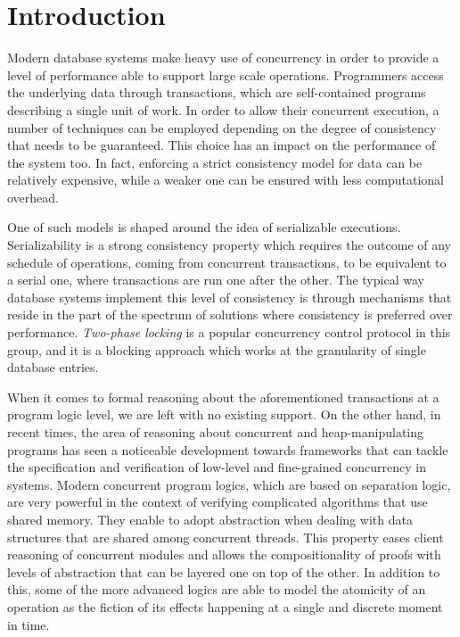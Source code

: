 \chapter{Introduction}

Modern database systems make heavy use of concurrency in order to provide a level of performance able to support large scale operations. Programmers access the underlying data through transactions, which are self-contained programs describing a single unit of work. In order to allow their concurrent execution, a number of techniques can be employed depending on the degree of consistency that needs to be guaranteed. This choice has an impact on the performance of the system too. In fact, enforcing a strict consistency model for data can be relatively expensive, while a weaker one can be ensured with less computational overhead.

One of such models is shaped around the idea of serializable executions. Serializability is a strong consistency property which requires the outcome of any schedule of operations, coming from concurrent transactions, to be equivalent to a serial one, where transactions are run one after the other. The typical way database systems implement this level of consistency is through mechanisms that reside in the part of the spectrum of solutions where consistency is preferred over performance. \textit{Two-phase locking} is a popular concurrency control protocol in this group, and it is a blocking approach which works at the granularity of single database entries.

When it comes to formal reasoning about the aforementioned transactions at a program logic level, we are left with no existing support. On the other hand, in recent times, the area of reasoning about concurrent and heap-manipulating programs has seen a noticeable development towards frameworks that can tackle the specification and verification of low-level and fine-grained concurrency in systems. Modern concurrent program logics, which are based on separation logic, are very powerful in the context of verifying complicated algorithms that use shared memory. They enable to adopt abstraction when dealing with data structures that are shared among concurrent threads. This property eases client reasoning of concurrent modules and allows the compositionality of proofs with levels of abstraction that can be layered one on top of the other. In addition to this, some of the more advanced logics are able to model the atomicity of an operation as the fiction of its effects happening at a single and discrete moment in time.

